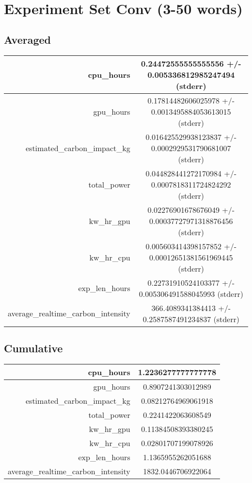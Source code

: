 \documentclass{article}%
\begin{document}
%
\normalsize%
\section{Experiment Set Conv (3{-}50 words)}%
\label{sec:Experiment Set Conv (3{-}50 words)}%
\subsection{Averaged}%
\label{subsec:Averaged}%
\begin{tabular}{|r|c|}%
\hline%
cpu\_hours&0.24472555555555556 +/{-} 0.005336812985247494 (stderr)\\%
\hline%
gpu\_hours&0.17814482606025978 +/{-} 0.0013495884053613015 (stderr)\\%
\hline%
estimated\_carbon\_impact\_kg&0.016425529938123837 +/{-} 0.0002929531790681007 (stderr)\\%
\hline%
total\_power&0.044828441272170984 +/{-} 0.0007818311724824292 (stderr)\\%
\hline%
kw\_hr\_gpu&0.02276901678676049 +/{-} 0.00037727971318876456 (stderr)\\%
\hline%
kw\_hr\_cpu&0.005603414398157852 +/{-} 0.00012651381561969445 (stderr)\\%
\hline%
exp\_len\_hours&0.22731910524103377 +/{-} 0.005306491588045993 (stderr)\\%
\hline%
average\_realtime\_carbon\_intensity&366.4089341384413 +/{-} 0.2587587491234837 (stderr)\\%
\hline%
\end{tabular}

%
\subsection{Cumulative}%
\label{subsec:Cumulative}%
\begin{tabular}{|r|c|}%
\hline%
cpu\_hours&1.2236277777777778\\%
\hline%
gpu\_hours&0.8907241303012989\\%
\hline%
estimated\_carbon\_impact\_kg&0.08212764969061918\\%
\hline%
total\_power&0.2241422063608549\\%
\hline%
kw\_hr\_gpu&0.11384508393380245\\%
\hline%
kw\_hr\_cpu&0.02801707199078926\\%
\hline%
exp\_len\_hours&1.1365955262051688\\%
\hline%
average\_realtime\_carbon\_intensity&1832.0446706922064\\%
\hline%
\end{tabular}

%
\end{document}
